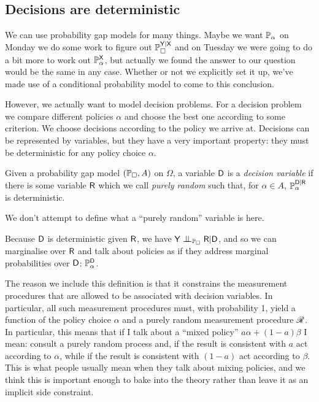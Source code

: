 
\subsection{Decisions are deterministic}

We can use probability gap models for many things. Maybe we want $\mathbb{P}_\alpha$ on Monday we do some work to figure out $\mathbb{P}_\square^{\mathsf{Y}|\mathsf{X}}$ and on Tuesday we were going to do a bit more to work out $\mathbb{P}_\alpha^{\mathsf{X}}$, but actually we found the answer to our question would be the same in any case. Whether or not we explicitly set it up, we've made use of a conditional probability model to come to this conclusion.

However, we actually want to model decision problems. For a decision problem we compare different policies $\alpha$ and choose the best one according to some criterion. We choose decisions according to the policy we arrive at. Decisions can be represented by variables, but they have a very important property: they must be deterministic for any policy choice $\alpha$.

\begin{definition}
Given a probability gap model $(\mathbb{P}_\square, A)$ on $\Omega$, a variable $\mathsf{D}$ is a \emph{decision variable} if there is some variable $\mathsf{R}$ which we call \emph{purely random} such that, for $\alpha\in A$, $\mathbb{P}_\alpha^{\mathsf{D}|\mathsf{R}}$ is deterministic.
\end{definition}

We don't attempt to define what a ``purely random'' variable is here.

Because $\mathsf{D}$ is deterministic given $\mathsf{R}$, we have $\RV{Y}\CI_{\prob{P}_\square}\RV{R}|\RV{D}$, and so we can marginalise over $\mathsf{R}$ and talk about policies as if they address marginal probabilities over $\mathsf{D}$: $\mathbb{P}_\alpha^{\mathsf{D}}$.

The reason we include this definition is that it constrains the measurement procedures that are allowed to be associated with decision variables. In particular, all such measurement procedures must, with probability 1, yield a function of the policy choice $\alpha$ and a purely random measurement procedure $\mathscr{R}$. In particular, this means that if I talk about a ``mixed policy'' $a\alpha+(1-a)\beta$ I mean: consult a purely random process and, if the result is consistent with $a$ act according to $\alpha$, while if the result is consistent with $(1-a)$ act according to $\beta$. This is what people usually mean when they talk about mixing policies, and we think this is important enough to bake into the theory rather than leave it as an implicit side constraint.

